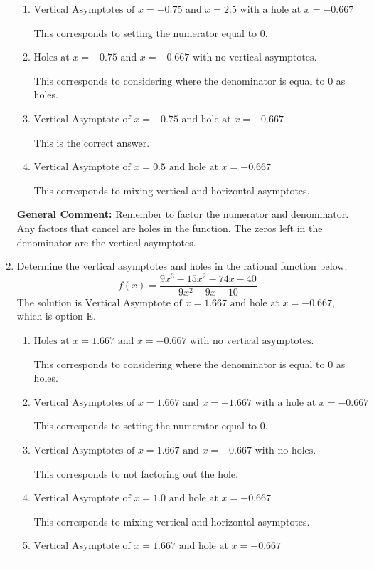 \documentclass{extbook}[14pt]
\newcommand{\litem}[1]{\item #1

\rule{\textwidth}{0.4pt}}
\begin{document}
\begin{enumerate}
{\begin{enumerate}[label=\Alph*.]
This corresponds to not factoring out the hole.
\item \( \text{Vertical Asymptotes of } x = -0.75 \text{ and } x = 2.5 \text{ with a hole at } x = -0.667 \)

This corresponds to setting the numerator equal to 0.
\item \( \text{Holes at } x = -0.75 \text{ and } x = -0.667 \text{ with no vertical asymptotes.} \)

This corresponds to considering where the denominator is equal to 0 as holes.
\item \( \text{Vertical Asymptote of } x = -0.75 \text{ and hole at } x = -0.667 \)

This is the correct answer.
\item \( \text{Vertical Asymptote of } x = 0.5 \text{ and hole at } x = -0.667 \)

This corresponds to mixing vertical and horizontal asymptotes.
\end{enumerate}

\textbf{General Comment:} Remember to factor the numerator and denominator. Any factors that cancel are holes in the function. The zeros left in the denominator are the vertical asymptotes.
}
\litem{
Determine the vertical asymptotes and holes in the rational function below.
\[ f(x) = \frac{9x^{3} -15 x^{2} -74 x -40}{9x^{2} -9 x -10} \]The solution is \( \text{Vertical Asymptote of } x = 1.667 \text{ and hole at } x = -0.667 \), which is option E.\begin{enumerate}[label=\Alph*.]
\item \( \text{Holes at } x = 1.667 \text{ and } x = -0.667 \text{ with no vertical asymptotes.} \)

This corresponds to considering where the denominator is equal to 0 as holes.
\item \( \text{Vertical Asymptotes of } x = 1.667 \text{ and } x = -1.667 \text{ with a hole at } x = -0.667 \)

This corresponds to setting the numerator equal to 0.
\item \( \text{Vertical Asymptotes of } x = 1.667 \text{ and } x = -0.667 \text{ with no holes.} \)

This corresponds to not factoring out the hole.
\item \( \text{Vertical Asymptote of } x = 1.0 \text{ and hole at } x = -0.667 \)

This corresponds to mixing vertical and horizontal asymptotes.
\item \( \text{Vertical Asymptote of } x = 1.667 \text{ and hole at } x = -0.667 \)


\end{enumerate}}
\end{enumerate}
\end{document}
